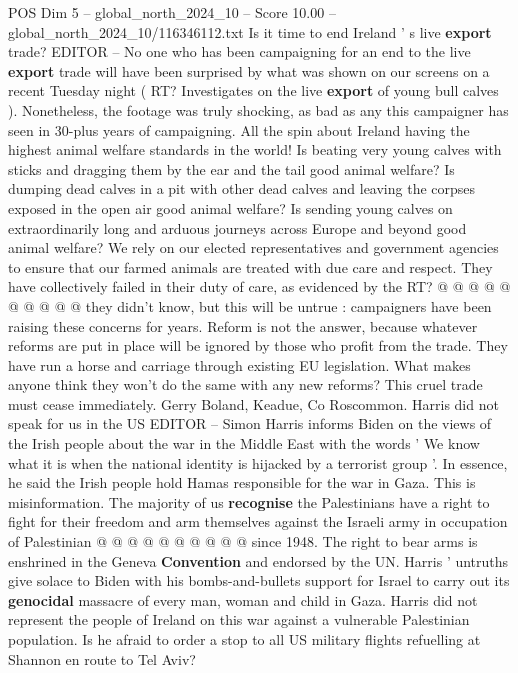 \begin{textsample}{POS Dim 5 – global\_north\_2024\_10 – Score 10.00 – global\_north\_2024\_10/116346112.txt}  \label{ex:f5_pos_410}
Is it time to end Ireland ' s live \textbf{export} trade?
EDITOR -- No one who has been campaigning for an end to the live \textbf{export} trade will have been surprised by what was shown on our screens on a recent Tuesday night ( RT?
Investigates on the live \textbf{export} of young bull calves ).
Nonetheless, the footage was truly shocking, as bad as any this campaigner has seen in 30-plus years of campaigning.
All the spin about Ireland having the highest animal welfare standards in the world!
Is beating very young calves with sticks and dragging them by the ear and the tail good animal welfare?
Is dumping dead calves in a pit with other dead calves and leaving the corpses exposed in the open air good animal welfare?
Is sending young calves on extraordinarily long and arduous journeys across Europe and beyond good animal welfare?
We rely on our elected representatives and government agencies to ensure that our farmed animals are treated with due care and respect.
They have collectively failed in their duty of care, as evidenced by the RT? @ @ @ @ @ @ @ @ @ @ they didn't know, but this will be untrue : campaigners have been raising these concerns for years.
Reform is not the answer, because whatever reforms are put in place will be ignored by those who profit from the trade.
They have run a horse and carriage through existing EU legislation.
What makes anyone think they won't do the same with any new reforms?
This cruel trade must cease immediately.
Gerry Boland, Keadue, Co Roscommon.
Harris did not speak for us in the US EDITOR -- Simon Harris informs Biden on the views of the Irish people about the war in the Middle East with the words ' We know what it is when the national identity is hijacked by a terrorist group '.
In essence, he said the Irish people hold Hamas responsible for the war in Gaza.
This is misinformation.
The majority of us \textbf{recognise} the Palestinians have a right to fight for their freedom and arm themselves against the Israeli army in occupation of Palestinian @ @ @ @ @ @ @ @ @ @ since 1948.
The right to bear arms is enshrined in the Geneva \textbf{Convention} and endorsed by the UN.
Harris ' untruths give solace to Biden with his bombs-and-bullets support for Israel to carry out its \textbf{genocidal} massacre of every man, woman and child in Gaza.
Harris did not represent the people of Ireland on this war against a vulnerable Palestinian population.
Is he afraid to order a stop to all US military flights refuelling at Shannon en route to Tel Aviv?

\end{textsample}
